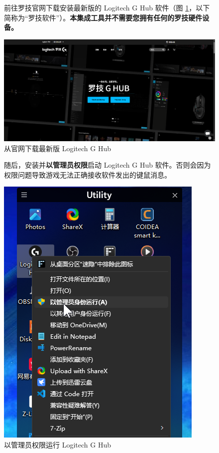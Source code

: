 \begin{figure}[H]
    \Centering
    \parbox[l]{\textwidth}{前往罗技官网下载安装最新版的 Logitech G Hub 软件（图 \ref{ch0fig-download-lghub}，以下简称为“罗技软件”）。\textbf{\color{red}本集成工具并不需要您拥有任何的罗技硬件设备。}}
    \includegraphics[width=\textwidth]{docs/assets/intro/download-lghub.png}
    \caption{从官网下载最新版 Logitech G Hub}
    \label{ch0fig-download-lghub}
\end{figure}

\begin{figure}[H]
    \Centering
    \parbox[l]{\textwidth}{随后，安装并\textbf{\color{red}以管理员权限}启动 Logitech G Hub 软件。否则会因为权限问题导致游戏无法正确接收软件发出的键鼠消息。}
    \includegraphics[width=\textwidth]{docs/assets/intro/run_lghub.png}
    \caption{以管理员权限运行 Logitech G Hub}
\end{figure}

